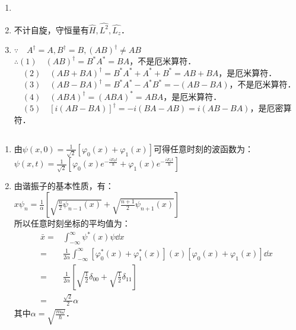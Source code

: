
\begin{issues}
\issueDraft
\issueTODO
\end{issues}


\subsection{ }
\begin{enumerate}
\item 
\item 不计自旋，守恒量有$\hat H,\hat {L^2},\hat {L_z} $．
\item $\because \quad A^{\dagger} = A,B^{\dagger} = B,(AB)^{\dagger} \neq AB $ \\
$\therefore (1)\quad (AB)^{\dagger} = B^*A^* = BA $，不是厄米算符． \\
$\quad (2)\quad (AB+BA)^{\dagger} = B^*A^*+A^*+B^* = AB+BA $，是厄米算符． \\
$\quad (3)\quad (AB-BA)^{\dagger} = B^*A^*-A^*B^* = -(AB-BA) $，不是厄米算符． \\
$\quad (4)\quad (ABA)^{\dagger} = (ABA)^* = ABA $，是厄米算符． \\
$\quad (5)\quad [i(AB-BA)]^{\dagger} = -i(BA-AB) = i(AB-BA) $，是厄密算符．
\end{enumerate}
\subsection{ }
\begin{enumerate}
\item 由$\psi (x,0) = \frac{1}{\sqrt{2}}[\varphi_{0}(x) + \varphi_{1}(x)] $可得任意时刻的波函数为：\\
$\psi(x,t) = \frac{1}{\sqrt{2}}\left[\varphi_{0}(x)e^{-\frac{iE_{0}t}{\hbar}} + \varphi_{1}(x)e^{-\frac{iE_{1}t}{\hbar}} \right] $
\item 由谐振子的基本性质，有：\\
$x\psi_{n} = \frac{1}{\alpha} \left[\sqrt{\frac{n}{2}\psi_{n-1}(x)} + \sqrt{\frac{n+1}{2}\psi_{n+1}(x)} \right] $ \\
所以任意时刻坐标的平均值为：\\
\begin{equation}
\begin{aligned}
\bar{x} =& \int^{\infty}_{-\infty} \psi^{*}(x)\psi \dd{x} \\
=& \frac{1}{2\alpha} \int^{\infty}_{-\infty} \left[\varphi^{*}_{0}(x)+\varphi^{*}_{1}(x)\right](x)\left[\varphi_{0}(x)+\varphi_{1}(x)\right] \dd{x} \\
=& \frac{1}{2\alpha} \left[\sqrt{\frac{1}{2}}\delta_{00}+\sqrt{\frac{1}{2}}\delta_{11} \right] \\
=& \frac{\sqrt{2}}{2} \alpha
\end{aligned}
\end{equation}
其中$\alpha = \sqrt{\frac{m\omega}{\hbar}} $．
\end{enumerate}
